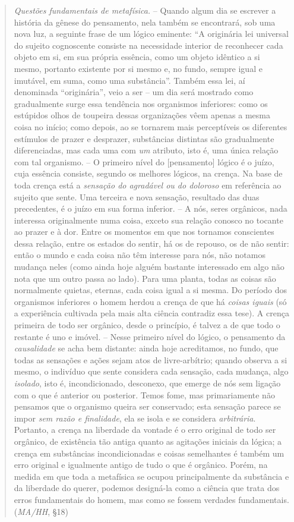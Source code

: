 \documentclass[
	12pt,				%
	openright,			%
	oneside,			%
	a4paper,			%
	english,			%
	french,				%
	spanish,			%
	brazil				%
	]{abntex2}
\begin{document}
\begin{quotation}
\textit{Questões fundamentais de metafísica.} – Quando algum dia se escrever a história da gênese do pensamento, nela também se encontrará, sob uma nova luz, a seguinte frase de um lógico eminente: “A originária lei universal do sujeito cognoscente consiste na necessidade interior de reconhecer cada objeto em si, em sua própria essência, como um objeto idêntico a si mesmo, portanto existente por si mesmo e, no fundo, sempre igual e imutável, em suma, como uma substância”. Também essa lei, aí denominada “originária”, veio a ser – um dia será mostrado como gradualmente surge essa tendência nos organismos inferiores: como os estúpidos olhos de toupeira dessas organizações vêem apenas a mesma coisa no início; como depois, ao se tornarem mais perceptíveis os diferentes estímulos de prazer e desprazer, substâncias distintas são gradualmente diferenciadas, mas cada uma com \textit{um} atributo, isto é, uma única relação com tal organismo. – O primeiro nível do [pensamento] lógico é o juízo, cuja essência consiste, segundo os melhores lógicos, na crença. Na base de toda crença está a \textit{sensação do agradável ou do doloroso} em referência ao sujeito que sente. Uma terceira e nova sensação, resultado das duas precedentes, é o juízo em sua forma inferior. – A nós, seres orgânicos, nada interessa originalmente numa coisa, exceto sua relação conosco no tocante ao prazer e à dor. Entre os momentos em que nos tornamos conscientes dessa relação, entre os estados do sentir, há os de repouso, os de não sentir: então o mundo e cada coisa não têm interesse para nós, não notamos mudança neles (como ainda hoje alguém bastante interessado em algo não nota que um outro passa ao lado). Para uma planta, todas as coisas são normalmente quietas, eternas, cada coisa igual a si mesma. Do período dos organismos inferiores o homem herdou a crença de que há \textit{coisas iguais} (só a experiência cultivada pela mais alta ciência contradiz essa tese). A crença primeira de todo ser orgânico, desde o princípio, é talvez a de que todo o restante é uno e imóvel. – Nesse primeiro nível do lógico, o pensamento da \textit{causalidade} se acha bem distante: ainda hoje acreditamos, no fundo, que todas as sensações e ações sejam atos de livre-arbítrio; quando observa a si mesmo, o indivíduo que sente considera cada sensação, cada mudança, algo \textit{isolado}, isto é, incondicionado, desconexo, que emerge de nós sem ligação com o que é anterior ou posterior. Temos fome, mas primariamente não pensamos que o organismo queira ser conservado; esta sensação parece se impor \textit{sem razão e finalidade}, ela se isola e se considera \textit{arbitrária}. Portanto, a crença na liberdade da vontade é o erro original de todo ser orgânico, de existência tão antiga quanto as agitações iniciais da lógica; a crença em substâncias incondicionadas e coisas semelhantes é também um erro original e igualmente antigo de tudo o que é orgânico. Porém, na medida em que toda a metafísica se ocupou principalmente da substância e da liberdade do querer, podemos designá-la como a ciência que trata dos erros fundamentais do homem, mas como se fossem verdades fundamentais. (\textit{MA/HH}, §18)
\end{quotation}
\end{document}
